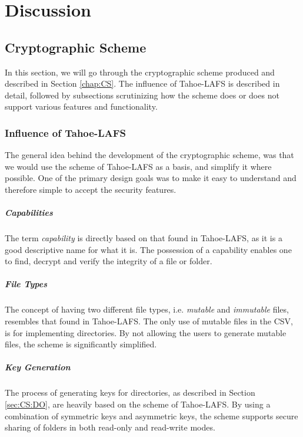 \documentclass[pdftex,english,10pt,b5paper,twoside]{book}
\begin{document}
\chapter{Discussion}
\label{ch:discussion}


\section{Cryptographic Scheme}

In this section, we will go through the cryptographic scheme produced and
described in Section \ref{chap:CS}. The influence of Tahoe-\ac{LAFS} is
described in detail, followed by subsections scrutinizing how the scheme does
or does not support various features and functionality.

\subsection{Influence of Tahoe-LAFS}

The general idea behind the development of the cryptographic scheme, was that
we would use the scheme of Tahoe-\ac{LAFS} as a basis, and simplify it where
possible. One of the primary design goals was to make it easy to
understand and therefore simple to accept the security features.

\paragraph{Capabilities} The term \emph{capability} is directly based on that
found in Tahoe-\ac{LAFS}, as it is a good descriptive name for what it is. The
possession of a capability enables one to find, decrypt and verify the
integrity of a file or folder.

\paragraph{File Types} The concept of having two different file types, i.e.
\emph{mutable} and \emph{immutable} files, resembles that found in
Tahoe-\ac{LAFS}. The only use of mutable files in the \acl{CSV}, is for
implementing directories. By not allowing the users to generate mutable files,
the scheme is significantly simplified.

\paragraph{Key Generation} The process of generating keys for directories, as
described in Section \ref{sec:CS:DO}, are heavily based on the scheme of
Tahoe-\ac{LAFS}. By using a combination of symmetric keys and asymmetric keys,
the scheme supports secure sharing of folders in both read-only and read-write
modes.
\end{document}
